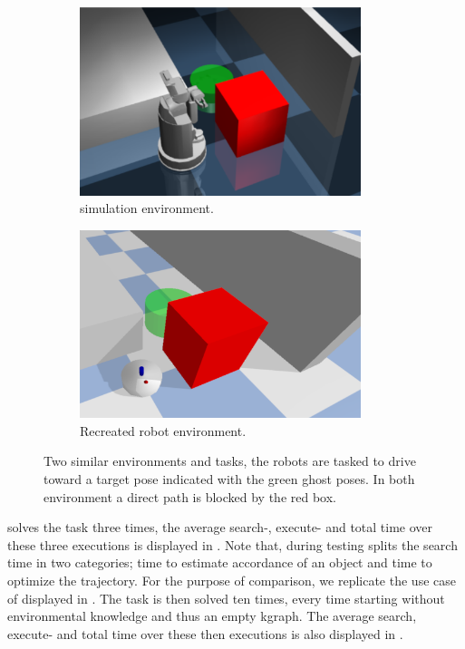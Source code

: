 \begin{figure}[H]
    \centering
    \begin{subfigure}{.49\textwidth}
    \centering
    \includegraphics[width=0.9\textwidth]{figures/results/wang_env}
    \caption{\citeauthor{wang_affordancebased_2020} simulation environment.}%
    \label{subfig:wang_env}
    \end{subfigure}
    \hfill
    \begin{subfigure}{.49\textwidth}
    \centering
    \includegraphics[width=0.9\textwidth]{figures/results/wang_mimick}
    \caption{Recreated robot environment.}%
    \label{subfig:wang_mimick}
    \end{subfigure}
    \caption{Two similar environments and tasks, the robots are tasked to drive toward a target pose indicated with the green ghost poses. In both environment a direct path is blocked by the red box.}%
    \label{fig:wang}
\end{figure}

\citeauthor{wang_affordancebased_2020} solves the task three times, the average search-, execute- and total time over these three executions is displayed in . Note that, during testing \citeauthor{wang_affordancebased_2020} splits the search time in two categories; time to estimate accordance of an object and time to optimize the trajectory. For the purpose of comparison, we replicate the use case of \citeauthor{wang_affordancebased_2020} displayed in . The task is then solved ten times, every time starting without environmental knowledge and thus an empty \ac{kgraph}. The average search, execute- and total time over these then executions is also displayed in .\bs

